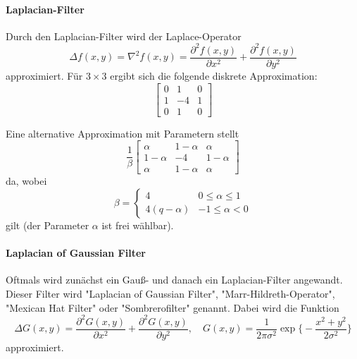 	\paragraph{Laplacian-Filter}
		Durch den Laplacian-Filter wird der Laplace-Operator
		\begin{equation*}
			\Delta f(x, y) = \nabla^2 f(x, y) = \frac{\partial^2 f(x, y)}{\partial x^2} + \frac{\partial^2 f(x, y)}{\partial y^2}
		\end{equation*}
		approximiert. Für \( 3 \times 3 \) ergibt sich \bspw die folgende diskrete Approximation:
		\begin{equation*}
			\begin{bmatrix}
				0 & 1  & 0 \\
				1 & -4 & 1 \\
				0 & 1  & 0
			\end{bmatrix}
		\end{equation*}

		Eine alternative Approximation mit Parametern stellt
		\begin{equation*}
			\frac{1}{\beta}
			\begin{bmatrix}
				\alpha     & 1 - \alpha & \alpha     \\
				1 - \alpha & -4         & 1 - \alpha \\
				\alpha     & 1 - \alpha & \alpha
			\end{bmatrix}
		\end{equation*}
		da, wobei
		\begin{equation*}
			\beta =
			\begin{cases}
				4             & 0 \leq \alpha \leq 1 \\
				4(q - \alpha) & -1 \leq \alpha < 0
			\end{cases}
		\end{equation*}
		gilt (der Parameter \( \alpha \) ist frei wählbar).

	\paragraph{Laplacian of Gaussian Filter}
		Oftmals wird zunächst ein Gauß- und danach ein Laplacian-Filter angewandt. Dieser Filter wird "Laplacian of Gaussian Filter", "Marr-Hildreth-Operator", "Mexican Hat Filter" oder "Sombrerofilter" genannt. Dabei wird die Funktion
		\begin{equation*}
			\Delta G(x, y) = \frac{\partial^2 G(x, y)}{\partial x^2} + \frac{\partial^2 G(x, y)}{\partial y^2},\quad G(x, y) = \frac{1}{2\pi\sigma^2} \exp \Bigg\{ -\frac{x^2 + y^2}{2\sigma^2} \Bigg\}
		\end{equation*}
		approximiert.

